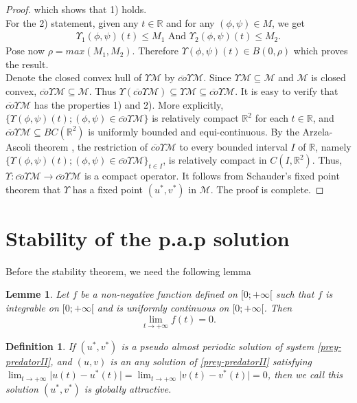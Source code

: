 \documentclass[[a4paper,10pt]{article}
\newcommand{\R}{\mathbb{R}}
\newtheorem{lemma}[theorem]{Lemme}%
\newtheorem{definition}[theorem]{Definition}%
\begin{document}
\begin{proof}
 which shows that 1) holds.\\
 \qquad For the  2) statement, given any $t\in \R$ and for any $(\phi,\psi)\in M$, we get 
  \begin{align*}
  \Upsilon_1(\phi,\psi)(t) \leq M_1\text{   And  }
 \Upsilon_2(\phi,\psi)(t) \leq M_2.
  \end{align*}
Pose now $\rho=max\left(M_1,M_2\right)$. Therefore $\Upsilon(\phi,\psi)(t)\in B(0,\rho)$ which proves the result.\\
Denote the closed convex hull of $\Upsilon \mathcal{M}$ by $\overline{co}\Upsilon \mathcal{M}$. Since $\Upsilon \mathcal{M}\subseteq \mathcal{M}$ and $\mathcal{M}$ is closed  convex,  $\overline{co}\Upsilon \mathcal{M}\subseteq \mathcal{M}$.  Thus 
$\Upsilon (\overline{co}\Upsilon \mathcal{M})\subseteq\Upsilon \mathcal{M}\subseteq \overline{co}\Upsilon \mathcal{M}$.  It  is  easy  to verify that $\overline{co}\Upsilon \mathcal{M}$ has the properties   1) and   2). More explicitly, $\{\Upsilon(\phi,\psi)(t);(\phi,\psi)\in \overline{co}\Upsilon \mathcal{M}\}$ is relatively compact $\R^2$ for each $t\in \R$, and $\overline{co}\Upsilon \mathcal{M}\subseteq BC(\R^2)$  is
 uniformly bounded and equi-continuous. By the Arzela-Ascoli theorem \cite{diagana2013almost}, the restriction of $\overline{co}\Upsilon \mathcal{M}$ to every bounded interval $I$ of $\R$, namely $\{\Upsilon(\phi,\psi)(t);(\phi,\psi)\in \overline{co}\Upsilon \mathcal{M}\}_{t\in I}$,  is  relatively  compact  in $C(I,\R^2)$.  Thus, $\Upsilon
 :\overline{co}\Upsilon \mathcal{M}\rightarrow\overline{co}\Upsilon\mathcal{M}$ is  a  compact  operator. It follows from Schauder's fixed point theorem that $\Upsilon$ has a fixed point $(u^*,v^*)$ in $\mathcal{M}$. The proof is complete.
  \end{proof}
   \section{Stability of the p.a.p solution }\hspace{1cm} Before the stability theorem, we need the following lemma 
\begin{lemma}\cite{gopalsamy1992stability}Let $f$ be a non-negative function defined on $[0;+\infty[$ such that $f$ is integrable on $[0;+\infty[$ and is uniformly continuous on $[0;+\infty[$. Then $$\lim_{t\rightarrow +\infty} f(t) =0.$$\end{lemma}
   \begin{definition} If $(u^*,v^*)$ is a pseudo almost periodic solution of system \eqref{prey-predatorII}, and $(u,v)$ is an any solution of \eqref{prey-predatorII} satisfying $\lim_{t\rightarrow+\infty}\big|u(t)-u^*(t)\big| =\lim_{t\rightarrow+\infty}\big|v(t)-v^*(t)\big|= 0$, then we call this 
solution $(u^*,v^*)$ is globally attractive.
\end{definition}
\end{document}
